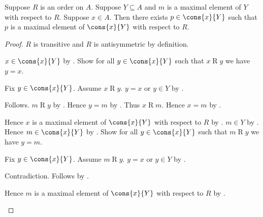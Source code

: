 \begin{proposition}\label{maximal_element_cons}
    Suppose $R$ is an order on $A$.
    Suppose $Y\subseteq A$ and
        $m$ is a maximal element of $Y$ with respect to $R$.
    Suppose $x\in A$.
    Then there exists $p\in\cons{x}{Y}$ such that
        $p$ is a maximal element of $\cons{x}{Y}$ with respect to $R$.
\end{proposition}
\begin{proof}
    $R$ is transitive and $R$ is antisymmetric by definition.
    \begin{byCase}
        $x\in\cons{x}{Y}$ by .
        Show for all $y\in\cons{x}{Y}$ such that $x\mathrel{R}y$
            we have $y=x$.
        \begin{subproof}
            Fix $y\in\cons{x}{Y}$.
            Assume $x\mathrel{R}y$.
            $y=x$ or $y\in Y$ by .
            \begin{byCase}
                Follows.
                $m\mathrel{R}y$ by .
                Hence $y=m$ by .
                Thus $x\mathrel{R}m$.
                Hence $x=m$ by .
            \end{byCase}
        \end{subproof}
        Hence $x$ is a maximal element of $\cons{x}{Y}$
            with respect to $R$ by .
        $m\in Y$ by .
        Hence $m\in\cons{x}{Y}$ by .
        Show for all $y\in\cons{x}{Y}$ such that $m\mathrel{R}y$
            we have $y=m$.
        \begin{subproof}
            Fix $y\in\cons{x}{Y}$.
            Assume $m\mathrel{R}y$.
            $y=x$ or $y\in Y$ by .
            \begin{byCase}
                Contradiction.
                Follows by .
            \end{byCase}
        \end{subproof}
        Hence $m$ is a maximal element of $\cons{x}{Y}$
            with respect to $R$ by .
    \end{byCase}
\end{proof}

